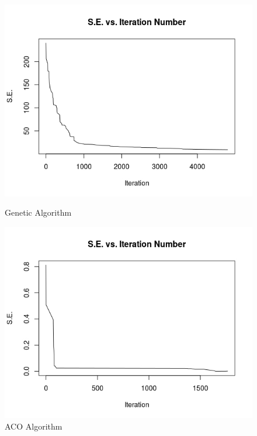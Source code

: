 \documentclass[11pt,a4paper,final]{article}
\begin{document}
	\begin{figure}[H]
		\begin{minipage}{.5\textwidth}
			\centering
			\includegraphics[scale= 0.4]{att48GAGraph}
			\caption{Genetic Algorithm}
			\label{fig:att48GA}
		\end{minipage}
		\begin{minipage}{.5\textwidth}
			\centering
			\includegraphics[scale=0.4]{Att48ACO}
			\caption{ACO Algorithm}					
			\label{fig:att48ACO}
		\end{minipage}
	\end{figure}
	\hspace{0pt}\\
\end{document}
